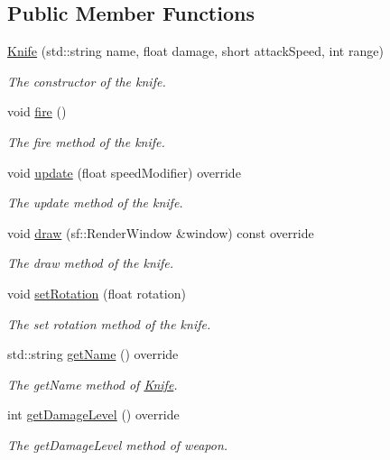 \subsection*{Public Member Functions}
\begin{DoxyCompactItemize}
\item 
\hyperlink{class_knife_a4556bddf2c8705c79f192157ad98e42b}{Knife} (std\+::string name, float damage, short attack\+Speed, int range)
\begin{DoxyCompactList}\small\item\em The constructor of the knife. \end{DoxyCompactList}\item 
void \hyperlink{class_knife_af90e68f00a874b1bc75a1bc91b8c84d8}{fire} ()
\begin{DoxyCompactList}\small\item\em The fire method of the knife. \end{DoxyCompactList}\item 
void \hyperlink{class_knife_ac861c5829858e00f82cbfdddb4a7d0b4}{update} (float speed\+Modifier) override
\begin{DoxyCompactList}\small\item\em The update method of the knife. \end{DoxyCompactList}\item 
void \hyperlink{class_knife_a747c0cc2dcc81df06f63cc4259ed3556}{draw} (sf\+::\+Render\+Window \&window) const override
\begin{DoxyCompactList}\small\item\em The draw method of the knife. \end{DoxyCompactList}\item 
void \hyperlink{class_knife_a3a6345197e3a146c311e28145a257665}{set\+Rotation} (float rotation)
\begin{DoxyCompactList}\small\item\em The set rotation method of the knife. \end{DoxyCompactList}\item 
std\+::string \hyperlink{class_knife_a45e5c10b9b6aa04b0ef71fbbf25269d4}{get\+Name} () override
\begin{DoxyCompactList}\small\item\em The get\+Name method of \hyperlink{class_knife}{Knife}. \end{DoxyCompactList}\item 
int \hyperlink{class_knife_a9a3afd5408784399fc9cc7afc33eb3cd}{get\+Damage\+Level} () override
\begin{DoxyCompactList}\small\item\em The get\+Damage\+Level method of weapon. \end{DoxyCompactList}\item 

\end{DoxyCompactItemize}
